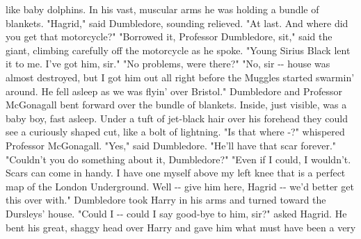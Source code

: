\documentclass{article}%
\begin{document}
\newline%
like baby dolphins. In his vast, muscular arms he was holding a bundle
\newline%
of blankets.
\newline%
"Hagrid," said Dumbledore, sounding relieved. "At last. And where did
\newline%
you get that motorcycle?"
\newline%
"Borrowed it, Professor Dumbledore, sit," said the giant, climbing
\newline%
carefully off the motorcycle as he spoke. "Young Sirius Black lent it to
\newline%
me. I've got him, sir."
\newline%
"No problems, were there?"
\newline%
"No, sir {-}{-} house was almost destroyed, but I got him out all right
\newline%
before the Muggles started swarmin' around. He fell asleep as we was
\newline%
flyin' over Bristol."
\newline%
Dumbledore and Professor McGonagall bent forward over the bundle of
\newline%
blankets. Inside, just visible, was a baby boy, fast asleep. Under a
\newline%
tuft of jet{-}black hair over his forehead they could see a curiously
\newline%
shaped cut, like a bolt of lightning.
\newline%
"Is that where {-}?" whispered Professor McGonagall.
\newline%
"Yes," said Dumbledore. "He'll have that scar forever."
\newline%
"Couldn't you do something about it, Dumbledore?"
\newline%
"Even if I could, I wouldn't. Scars can come in handy. I have one myself
\newline%
above my left knee that is a perfect map of the London Underground. Well
\newline%
{-}{-} give him here, Hagrid {-}{-} we'd better get this over with."
\newline%
Dumbledore took Harry in his arms and turned toward the Dursleys' house.
\newline%
"Could I {-}{-} could I say good{-}bye to him, sir?" asked Hagrid. He bent his
\newline%
great, shaggy head over Harry and gave him what must have been a very
\end{document}
